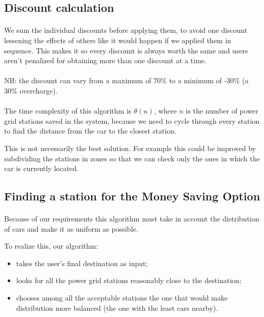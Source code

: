 \documentclass[english]{article}
\begin{document}
\begin{itemize}
\subsection{Discount calculation}



\paragraph{}
We sum the individual discounts before applying them, to avoid one discount lessening the effects of others like it would happen if we applied them in sequence. This makes it so every discount is always worth the same and users aren't penalized for obtaining more than one discount at a time.

\paragraph{}
NB: the discount can vary from a maximum of 70\% to a minimum of -30\% (a 30\% overcharge).

\paragraph{}
The time complexity of this algorithm is $\theta(n)$, where $n$ is the number of power grid stations saved in the system, because we need to cycle through every station to find the distance from the car to the closest station.

This is not necessarily the best solution. For example this could be improved by subdividing the stations in zones so that we can check only the ones in which the car is currently located.

\newpage
\subsection{Finding a station for the Money Saving Option}

	

\paragraph{}
Because of our requirements this algorithm must take in account the distribution of cars and make it as uniform as possible.

To realize this, our algorithm:
\begin{itemize}
	\item{takes the user's final destination as input;}
	\item{looks for all the power grid stations reasonably close to the destination;}
	\item{chooses among all the acceptable stations the one that would make distribution more balanced (the one with the least cars nearby).}
\end{itemize}


\end{itemize}
\end{document}
